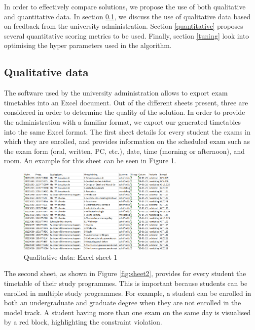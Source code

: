 In order to effectively compare solutions, we propose the use of both qualitative and quantitative data. In section \ref{qualitative}, we discuss the use of qualitative data based on feedback from the university administration. Section \ref{quantitative} proposes several quantitative scoring metrics to be used. Finally, section \ref{tuning} look into optimising the hyper parameters used in the algorithm.

\subsection{Qualitative data} \label{qualitative}

The software used by the university administration allows to export exam timetables into an Excel document. Out of the different sheets present, three are considered in order to determine the quality of the solution. In order to provide the administration with a familiar format, we export our generated timetables into the same Excel format. The first sheet details for every student the exams in which they are enrolled, and provides information on the scheduled exam such as the exam form (oral, written, PC, etc.), date, time (morning or afternoon), and room. An example for this sheet can be seen in Figure \ref{fig:sheet1}. 

\begin{figure}[H]
	\centering
	\includegraphics[width=0.7\textwidth]{images/excel/excel_sheet1.png} 
	\caption{Qualitative data: Excel sheet 1}
	\label{fig:sheet1}
\end{figure}

The second sheet, as shown in Figure \ref{fig:sheet2}, provides for every student the timetable of their study programmes. This is important because students can be enrolled in multiple study programmes. For example, a student can be enrolled in both an undergraduate and graduate degree when they are not enrolled in the model track. A student having more than one exam on the same day is visualised by a red block, highlighting the constraint violation.

